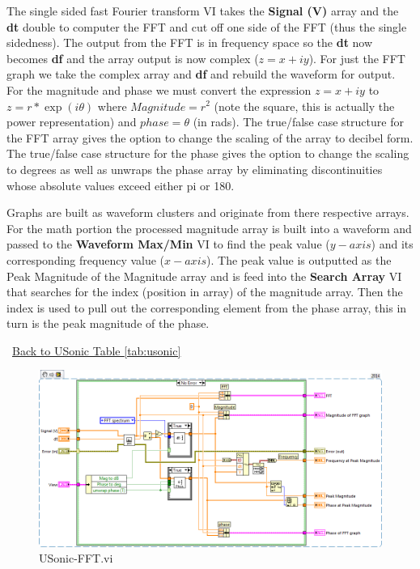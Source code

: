 \documentclass[11pt,a4paper,oldfontcommands]{memoir}
\begin{document}
The single sided fast Fourier transform VI takes the \textbf{Signal (V)} array and the \textbf{dt} double to computer the FFT and cut off one side of the FFT (thus the single sidedness). The output from the FFT is in frequency space so the \textbf{dt} now becomes \textbf{df} and the array output is now complex ($z=x+iy$). For just the FFT graph we take the complex array and \textbf{df} and rebuild the waveform for output. For the magnitude and phase we must convert the expression $z=x+iy$ to $z=r*\exp(i\theta)$ where $Magnitude=r^2$ (note the square, this is actually the power representation) and $phase=\theta$ (in rads). The true/false case structure for the FFT array gives the option to change the scaling of the array to decibel form. The true/false case structure for the phase gives the option to change the scaling to degrees as well as unwraps the phase array by eliminating discontinuities whose absolute values exceed either pi or 180.

Graphs are built as waveform clusters and originate from there respective arrays. For the math portion the processed magnitude array is built into a waveform and passed to the \textbf{Waveform Max/Min} VI to find the peak value ($y-axis$) and its corresponding frequency value ($x-axis$). The peak value is outputted as the Peak Magnitude of the Magnitude array and is feed into the \textbf{Search Array} VI that searches for the index (position in array) of the magnitude array. Then the index is used to pull out the corresponding element from the phase array, this in turn is the peak magnitude of the phase.

\noindent\hrulefill\, \hyperref[tab:usonic]{Back to USonic Table \ref{tab:usonic}}

\begin{figure}[H]
	\includegraphics[width=\textwidth]{USonic-FFT_blockdiagram_01}
	\caption{USonic-FFT.vi}
	\label{fig:USonic-FFT-blkdig}
\end{figure}
\end{document}
